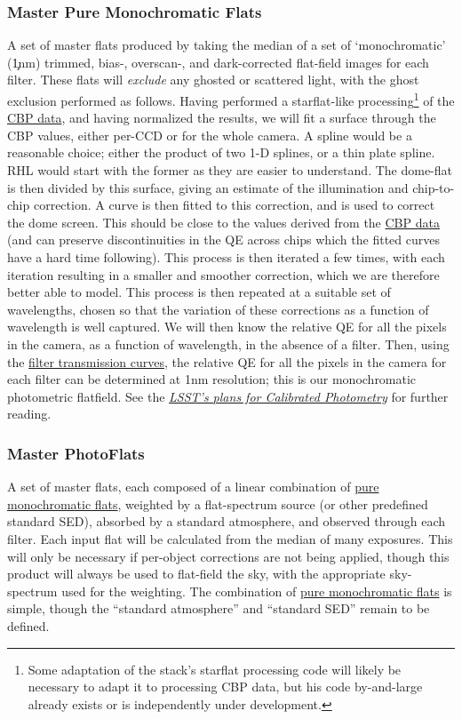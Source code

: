\subsubsection{Master Pure Monochromatic Flats}\label{sec:CPP:output:monoPhotoFlat}
A set of master flats produced by taking the median of a set of `monochromatic' (\c 1nm) trimmed, bias-, overscan-, and dark-corrected flat-field images for each filter. These flats will \emph{exclude} any ghosted or scattered light, with the ghost exclusion performed as follows.
\alg Having performed a starflat-like processing\footnote{ Some adaptation of the stack's starflat processing code will likely be necessary to adapt it to processing CBP data, but his code by-and-large already exists or is independently under development.} of the \hyperref[sec:CPP:inputs:CBP]{CBP data}, and having normalized the results, we will fit a surface through the CBP values, either per-CCD or for the whole camera. A spline would be a reasonable choice; either the product of two 1-D splines, or a thin plate spline. RHL would start with the former as they are easier to understand. The dome-flat is then divided by this surface, giving an estimate of the illumination and chip-to-chip correction. A curve is then fitted to this correction, and is used to correct the dome screen. This should be close to the values derived from the \hyperref[sec:CPP:inputs:CBP]{CBP data} (and can preserve discontinuities in the QE across chips which the fitted curves have a hard time following). This process is then iterated a few times, with each iteration resulting in a smaller and smoother correction, which we are therefore better able to model. This process is then repeated at a suitable set of wavelengths, chosen so that the variation of these corrections as a function of wavelength is well captured. We will then know the relative QE for all the pixels in the camera, as a function of wavelength, in the absence of a filter. Then, using the \hyperref[sec:CPP:output:filterTransmission]{filter transmission curves}, the relative QE for all the pixels in the camera for each filter can be determined at 1nm resolution; this is our monochromatic photometric flatfield. See the \hyperref{https://github.com/lsst-dm/calibration/blob/master/calibration.pdf}{}{}{\emph{LSST's plans for Calibrated Photometry}} for further reading.

\subsubsection{Master PhotoFlats}\label{sec:CPP:output:standardPhotoFlat}
A set of master flats, each composed of a linear combination of \hyperref[sec:CPP:output:monoPhotoFlat]{pure monochromatic flats}, weighted by a flat-spectrum source (or other predefined standard SED), absorbed by a standard atmosphere, and observed through each filter. Each input flat will be calculated from the median of many exposures. This will only be necessary if per-object corrections are not being applied, though this product will always be used to flat-field the sky, with the appropriate sky-spectrum used for the weighting.
\alg The combination of \hyperref[sec:CPP:output:monoPhotoFlat]{pure monochromatic flats} is simple, though the ``standard atmosphere'' and ``standard SED'' remain to be defined. 


